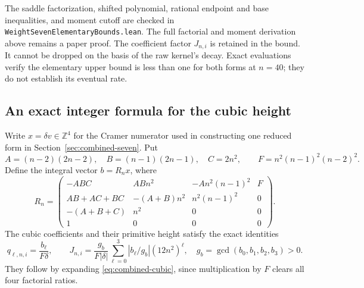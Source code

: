 \documentclass[11pt]{article}
\theoremstyle{remark}
\newcommand{\Z}{\mathbb Z}
\begin{document}
The saddle factorization, shifted polynomial, rational endpoint and
base inequalities, and moment cutoff are checked in
\texttt{WeightSevenElementaryBounds.lean}. The full factorial and moment
derivation above remains a paper proof. The coefficient factor \(J_{n,i}\)
is retained in the bound. It cannot be dropped on the basis of the raw
kernel's decay. Exact evaluations verify the elementary upper bound is
less than one for both forms at \(n=40\); they do not establish its
eventual rate.

\subsection{An exact integer formula for the cubic height}
Write \(x=\delta v\in\Z^4\) for the Cramer numerator used in constructing
one reduced form in Section~\ref{sec:combined-seven}. Put
\[
 A=(n-2)(2n-2),\quad B=(n-1)(2n-1),\quad C=2n^2,
 \qquad F=n^2(n-1)^2(n-2)^2.
\]
Define the integral vector \(b=R_nx\), where
\[
 R_n=\begin{pmatrix}
 -ABC&ABn^2&-An^2(n-1)^2&F\\
 AB+AC+BC&-(A+B)n^2&n^2(n-1)^2&0\\
 -(A+B+C)&n^2&0&0\\
 1&0&0&0
 \end{pmatrix}.
\]
The cubic coefficients and their primitive height satisfy the exact
identities
\begin{equation}
 q_{\ell,n,i}=\frac{b_\ell}{F\delta},\qquad
 J_{n,i}=\frac{g_b}{F|\delta|}
          \sum_{\ell=0}^3|b_\ell/g_b|(12n^2)^\ell,
 \quad g_b=\gcd(b_0,b_1,b_2,b_3)>0.
 \label{eq:integer-cubic-height}
\end{equation}
They follow by expanding \eqref{eq:combined-cubic}, since multiplication
by \(F\) clears all four factorial ratios.
\end{document}
